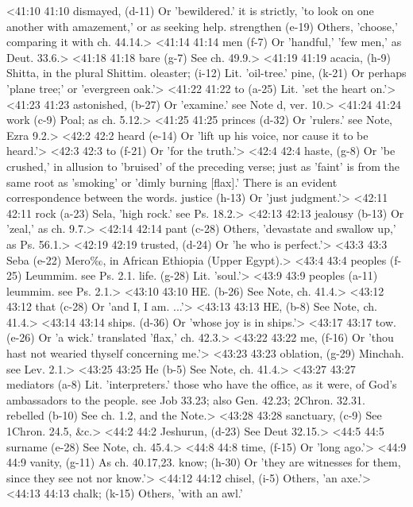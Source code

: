 <41:10 41:10  dismayed, (d-11)  Or 'bewildered.' it is strictly, 'to look on one another with  amazement,' or as seeking help.
  strengthen (e-19)  Others, 'choose,' comparing it with ch. 44.14.>
<41:14 41:14  men (f-7)  Or 'handful,' 'few men,' as Deut. 33.6.>
<41:18 41:18  bare (g-7)  See ch. 49.9.>
<41:19 41:19  acacia, (h-9)  Shitta, in the plural Shittim.
  oleaster; (i-12)  Lit. 'oil-tree.'
  pine, (k-21)  Or perhaps 'plane tree;' or 'evergreen oak.'>
<41:22 41:22  to (a-25)  Lit. 'set the heart on.'>
<41:23 41:23  astonished, (b-27)  Or  'examine.' see Note d, ver. 10.>
<41:24 41:24  work (c-9)  Poal; as ch. 5.12.>
<41:25 41:25  princes (d-32)  Or 'rulers.' see Note, Ezra 9.2.>
<42:2 42:2  heard (e-14)  Or 'lift up his voice, nor cause it to be heard.'>
<42:3 42:3  to (f-21)  Or 'for the truth.'>
<42:4 42:4  haste, (g-8)  Or 'be crushed,' in allusion to 'bruised' of the preceding  verse; just as 'faint' is from the same root as 'smoking' or  'dimly burning [flax].' There is an evident correspondence  between the words.
  justice (h-13)  Or 'just judgment.'>
<42:11 42:11  rock (a-23)  Sela, 'high rock.' see Ps. 18.2.>
<42:13 42:13  jealousy (b-13)  Or 'zeal,' as ch. 9.7.>
<42:14 42:14  pant (c-28)  Others, 'devastate and swallow up,' as Ps. 56.1.>
<42:19 42:19  trusted, (d-24)  Or 'he who is perfect.'>
<43:3 43:3  Seba (e-22)  Mero‰, in African Ethiopia (Upper Egypt).>
<43:4 43:4  peoples (f-25)  Leummim. see Ps. 2.1.
  life. (g-28)  Lit. 'soul.'>
<43:9 43:9  peoples (a-11)  leummim. see Ps. 2.1.>
<43:10 43:10  HE. (b-26)  See Note, ch. 41.4.>
<43:12 43:12  that (c-28)  Or 'and I, I am. ...'>
<43:13 43:13  HE, (b-8)  See Note, ch. 41.4.>
<43:14 43:14  ships. (d-36)  Or 'whose joy is in ships.'>
<43:17 43:17  tow. (e-26)  Or 'a wick.' translated 'flax,' ch. 42.3.>
<43:22 43:22  me, (f-16)  Or 'thou hast not wearied thyself concerning me.'>
<43:23 43:23  oblation, (g-29)  Minchah. see Lev. 2.1.>
<43:25 43:25  He (b-5)  See Note, ch. 41.4.>
<43:27 43:27  mediators (a-8)  Lit. 'interpreters.' those who have the office, as it were,  of God's ambassadors to the people. see Job 33.23; also Gen. 42.23; 2Chron. 32.31.
  rebelled (b-10)  See ch. 1.2, and the Note.>
<43:28 43:28  sanctuary, (c-9)  See 1Chron. 24.5, &c.>
<44:2 44:2  Jeshurun, (d-23)  See Deut 32.15.>
<44:5 44:5  surname (e-28)  See Note, ch. 45.4.>
<44:8 44:8  time, (f-15)  Or 'long ago.'>
<44:9 44:9  vanity, (g-11)  As ch. 40.17,23.
  know; (h-30)  Or 'they are witnesses for them, since they see not nor  know.'>
<44:12 44:12  chisel, (i-5)  Others, 'an axe.'>
<44:13 44:13  chalk; (k-15)  Others, 'with an awl.'
